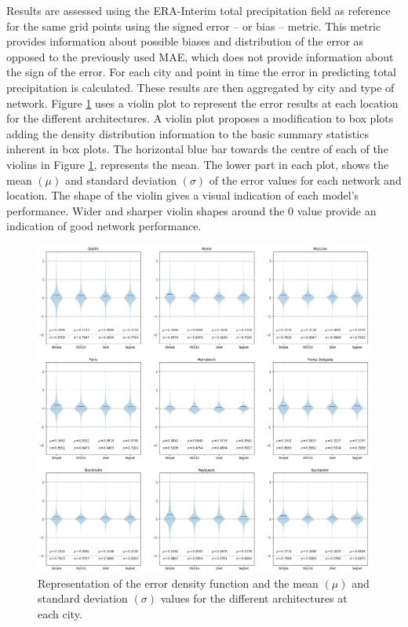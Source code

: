 \documentclass[twocol]{ametsoc}
\begin{document}
Results are assessed using the ERA-Interim total precipitation field as reference for the same grid points using the signed error -- or bias -- metric. This metric provides information about possible biases and distribution of the error as opposed to the previously used MAE, which does not provide information about the sign of the error. For each city and point in time the error in predicting total precipitation is calculated. These results are then aggregated by city and type of network. Figure \ref{violin} uses a violin plot \citep{hintze1998violin} to represent the error results at each location for the different architectures. A violin plot proposes a modification to box plots adding the density distribution information to the basic summary statistics inherent in box plots. The horizontal blue bar towards the centre of each of the violins in Figure \ref{violin}, represents the mean. The lower part in each plot, shows the mean $(\mu)$ and standard deviation $(\sigma)$ of the error values for each network and location. The shape of the violin gives a visual indication of each model's performance. Wider and sharper violin shapes around the 0 value provide an indication of good network performance.

\begin{figure}[h]
 \centerline{\includegraphics[width=16cm]{violin.png}}
  \caption{Representation of the error density function and the mean $(\mu)$ and standard deviation $(\sigma)$ values for the different architectures at each city.}\label{violin}
\end{figure}
\end{document}
